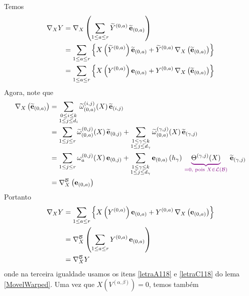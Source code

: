 \begin{demm}
Temos
\begin{align*}
\nabla_X Y &= \nabla_X\left(\sum_{1 \leq a \leq  r} \widetilde{Y}^{(0, a)} \,  \widetilde{\mathbf{e}}_{(0, a)} \right) \\
&= \sum_{1 \leq a \leq r} \left\{  X\left(\widetilde{Y}^{(0, a)} \right)  \widetilde{\mathbf{e}}_{(0, a)} + \widetilde{Y}^{(0, a)} \,  \nabla_X \left( \widetilde{\mathbf{e}}_{(0, a)} \right) \right\} \\
&= \sum_{1 \leq a \leq r} \left\{  X\left(Y^{(0, a)} \right)  \mathbf{e}_{(0, a)} + Y^{(0, a)} \,  \nabla_X \left( \widetilde{\mathbf{e}}_{(0, a)} \right) \right\}
\end{align*}
Agora, note que
\begin{align*}
 \nabla_X \left( \widetilde{\be}_{(0, a)} \right) &=  \sum_{\substack{0 \leq i \leq k\\
1 \leq j \leq d_i 
}}  \widetilde{\omega}^{(i, j)}_{(0, a)}(X) \, \widetilde{\be}_{(i, j)} \\
&= \sum_{1 \leq j \leq r} \widetilde{\omega}^{(0, j)}_{(0, a)}(X) \, \widetilde{\be}_{(0, j)} + \sum_{\substack{1 \leq \gamma \leq k\\
1 \leq j \leq d_{\gamma}
}}  \widetilde{\omega}^{(\gamma, j)}_{(0, a)}(X) \, \widetilde{\be}_{(\gamma, j)} \\
&= \sum_{1 \leq j \leq r} \omega^{(0, j)}_a(X) \, \be_{(0, j)} + \sum_{\substack{1 \leq \gamma \leq k\\
1 \leq j \leq d_{\gamma}
}} \be_{(0, a)} \left(h_{\gamma} \right) \, \Munderbrace{\Theta^{(\gamma, j)}(X)}{=0, \text{ pois } X \in \mathcal{L}(\mathcal{B})} \, \widetilde{\be}_{(\gamma, j)}  \\
&= \nabla^{\mathcal{B}}_{X} \left( \be_{(0, a)} \right)
\end{align*}
Portanto
\begin{align*}
\nabla_X Y &= \sum_{1 \leq a \leq r} \left\{ X\left(Y^{(0, a)} \right)  \mathbf{e}_{(0, a)} + Y^{(0, a)} \,  \nabla_X \left( \mathbf{e}_{(0, a)} \right) \right\} \\
&=\nabla^{\mathcal{B}}_X \left( \sum_{1 \leq a \leq r}  Y^{(0, a)} \, \mathbf{e}_{(0, a)} \right) \\
&= \nabla^{\mathcal{B}}_X Y
\end{align*}
onde na terceira igualdade usamos os itens \ref{letraA118} e \ref{letraC118} do lema \cref{MovelWarped}. Uma vez que $X\left( V^{(\alpha, \beta)} \right) = 0$, temos também


\end{demm}
